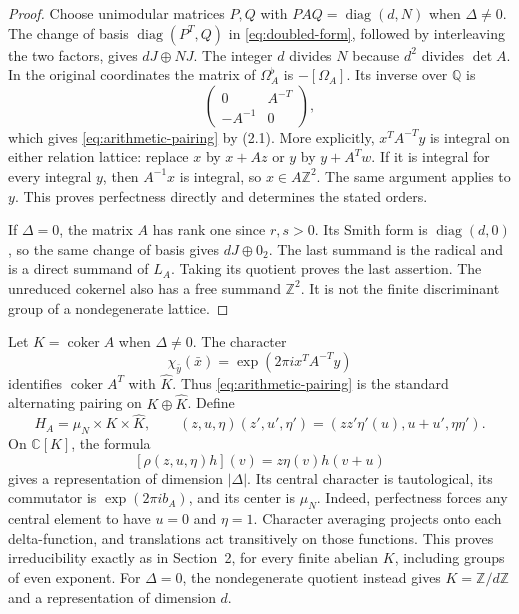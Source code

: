 \begin{proof}
Choose unimodular matrices $P,Q$ with $PAQ=\operatorname{diag}(d,N)$
when $\Delta\ne0$.  The change of basis
$\operatorname{diag}(P^T,Q)$ in \eqref{eq:doubled-form}, followed by
interleaving the two factors, gives $dJ\oplus NJ$.
The integer $d$ divides $N$ because $d^2$ divides $\det A$.
In the original coordinates the matrix of $\Omega_A^\flat$ is
$-[\Omega_A]$.  Its inverse over $\mathbb Q$ is
\[
        \begin{pmatrix}0&A^{-T}\\-A^{-1}&0\end{pmatrix},
\]
which gives \eqref{eq:arithmetic-pairing} by (2.1).
More explicitly, $x^TA^{-T}y$ is integral on either relation lattice:
replace $x$ by $x+Az$ or $y$ by $y+A^Tw$.
If it is integral for every integral $y$, then $A^{-1}x$ is integral,
so $x\in A\mathbb Z^2$.  The same argument applies to $y$.
This proves perfectness directly and determines the stated orders.

If $\Delta=0$, the matrix $A$ has rank one since $r,s>0$.
Its Smith form is $\operatorname{diag}(d,0)$, so the same change of
basis gives $dJ\oplus0_2$.  The last summand is the radical and is a
direct summand of $L_A$.  Taking its quotient proves the last assertion.
The unreduced cokernel also has a free summand $\mathbb Z^2$.
It is not the finite discriminant group of a nondegenerate lattice.
\end{proof}

Let $K=\operatorname{coker}A$ when $\Delta\ne0$.
The character
\[
 \chi_{\bar y}(\bar x)=\exp(2\pi i x^TA^{-T}y)
\]
identifies $\operatorname{coker}A^T$ with $\widehat K$.
Thus \eqref{eq:arithmetic-pairing} is the standard alternating pairing
on $K\oplus\widehat K$.
Define
\[
 H_A=\mu_N\times K\times\widehat K,\qquad
 (z,u,\eta)(z',u',\eta')=(zz'\eta'(u),u+u',\eta\eta').
\]
On $\mathbb C[K]$, the formula
\[
                 [\rho(z,u,\eta)h](v)=z\eta(v)h(v+u)
\]
gives a representation of dimension $|\Delta|$.
Its central character is tautological, its commutator is
$\exp(2\pi i b_A)$, and its center is $\mu_N$.
Indeed, perfectness forces any central element to have $u=0$ and
$\eta=1$.  Character averaging projects onto each delta-function,
and translations act transitively on those functions.
This proves irreducibility exactly as in Section~2, for every finite
abelian $K$, including groups of even exponent.
For $\Delta=0$, the nondegenerate quotient instead gives
$K=\mathbb Z/d\mathbb Z$ and a representation of dimension $d$.

